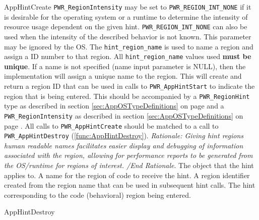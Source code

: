\begin{prototype}{AppHintCreate}
{ \texttt{PWR_RegionIntensity} may be set to \texttt{PWR_REGION_INT_NONE} 
if it is desirable for the operating system or a runtime to determine the intensity of resource usage dependent
on the given hint. \texttt{PWR_REGION_INT_NONE} can also be used when the intensity of the described behavior is 
not known. This parameter may be ignored by the OS.
The \texttt{hint_region_name} is used to name a region and assign a ID number to that region.
All \texttt{hint_region_name} values used \textbf{must be unique}.
If a name is not specified (name input parameter is NULL), then the implementation will assign a unique name to the region.
This will create and return a region ID that can be used in calls to \texttt{PWR_AppHintStart} to indicate
the region that is being entered.
This should be accompanied by a \texttt{PWR_RegionHint} type as described in section \ref{sec:AppOSTypeDefinitions} on page \pageref{type:RegionHint} and
a \texttt{PWR_RegionIntensity} as described in section \ref{sec:AppOSTypeDefinitions} on page \pageref{type:RegionIntensity}.
All calls to \texttt{PWR_AppHintCreate} should be matched to a call to \texttt{PWR_AppHintDestroy} (\ref{func:AppHintDestroy}). 
\emph{Rationale: Giving hint regions human readable names facilitates easier display and debugging of information associated with the region,
allowing for performance reports to be generated from the OS/runtime for regions of interest. /End Rationale}.
	}
			{\pInput}	{The object that the hint applies to.}
		{\pInput}	{A name for the region of code to receive the hint.}
		{\pInputOutput}	{A region identifier created from the region name that can be used in subsequent hint calls.}
		{\pInput}	{The hint corresponding to the code (behavioral) region being entered.}
\end{prototype}


\begin{prototype}{AppHintDestroy}
\end{prototype}

